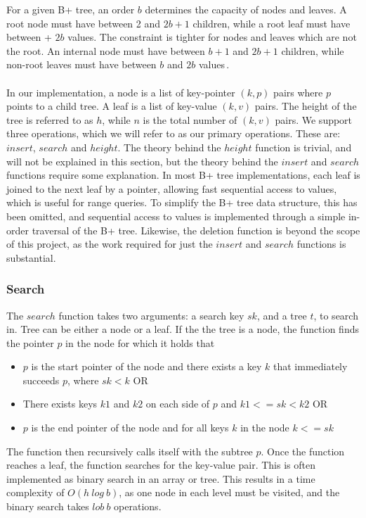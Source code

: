 For a given B+ tree, an order $b$ determines the capacity of nodes and leaves. A root node must have between 2 and $2b+1$ children, while a root leaf must have between + $2b$ values. The constraint is tighter for nodes and leaves which are not the root. An internal node must have between $b+1$ and $2b+1$ children, while non-root leaves must have between $b$ and $2b$ values\,\cite[p. 335]{ramakrishnan2003database}. 

\paragraph{}
In our implementation, a node is a list of key-pointer $(k, p)$ pairs where $p$ points to a child tree. A leaf is a list of key-value $(k, v)$ pairs. The height of the tree is referred to as $h$, while $n$ is the total number of $(k, v)$ pairs. We support three operations, which we will refer to as our primary operations. These are: $insert$, $search$ and $height$. The theory behind the $height$ function is trivial, and will not be explained in this section, but the theory behind the $insert$ and $search$ functions require some explanation. In most B+ tree implementations, each leaf is joined to the next leaf by a pointer, allowing fast sequential access to values, which is useful for range queries. To simplify the B+ tree data structure, this has been omitted, and sequential access to values is implemented through a simple in-order traversal of the B+ tree. Likewise, the deletion function is beyond the scope of this project, as the work required for just the $insert$ and $search$ functions is substantial.

\subsubsection{Search}
\label{subsec:Search}
The $search$ function takes two arguments: a search key $sk$, and a tree $t$, to search in. Tree can be either a node or a leaf. If the the tree is a node, the function finds the pointer $p$ in the node for which it holds that
\begin{itemize}
	\item $p$ is the start pointer of the node and there exists a key $k$ that immediately succeeds $p$, where $sk < k$ OR
	\item There exists keys $k1$ and $k2$ on each side of $p$ and $k1 <= sk < k2$ OR
	\item $p$ is the end pointer of the node and for all keys $k$ in the node $k <= sk$
\end{itemize}
The function then recursively calls itself with the subtree $p$. Once the function reaches a leaf, the function searches for the key-value pair. This is often implemented as binary search in an array or tree. This results in a time complexity of $O(h~log~b)$, as one node in each level must be visited, and the binary search takes $lob~b$ operations.

